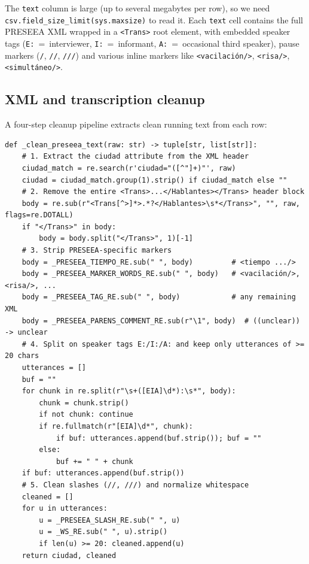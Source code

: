 \documentclass[11pt,a4paper]{article}
\begin{document}
The \texttt{text} column is large (up to several megabytes per row), so
we need \texttt{csv.field\_size\_limit(sys.maxsize)} to read it. Each
\texttt{text} cell contains the full PRESEEA XML wrapped in a
\texttt{<Trans>} root element, with embedded speaker tags
(\texttt{E:}\ =\ interviewer, \texttt{I:}\ =\ informant,
\texttt{A:}\ =\ occasional third speaker), pause markers
(\texttt{/}, \texttt{//}, \texttt{///}) and various inline markers like
\texttt{<vacilación/>}, \texttt{<risa/>}, \texttt{<simultáneo/>}.

\subsection{XML and transcription cleanup}

A four-step cleanup pipeline extracts clean running text from each row:

\begin{lstlisting}[style=pycode,caption={PRESEEA transcription cleaner.}]
def _clean_preseea_text(raw: str) -> tuple[str, list[str]]:
    # 1. Extract the ciudad attribute from the XML header
    ciudad_match = re.search(r'ciudad="([^"]+)"', raw)
    ciudad = ciudad_match.group(1).strip() if ciudad_match else ""
    # 2. Remove the entire <Trans>...</Hablantes></Trans> header block
    body = re.sub(r"<Trans[^>]*>.*?</Hablantes>\s*</Trans>", "", raw, flags=re.DOTALL)
    if "</Trans>" in body:
        body = body.split("</Trans>", 1)[-1]
    # 3. Strip PRESEEA-specific markers
    body = _PRESEEA_TIEMPO_RE.sub(" ", body)         # <tiempo .../>
    body = _PRESEEA_MARKER_WORDS_RE.sub(" ", body)   # <vacilación/>, <risa/>, ...
    body = _PRESEEA_TAG_RE.sub(" ", body)            # any remaining XML
    body = _PRESEEA_PARENS_COMMENT_RE.sub(r"\1", body)  # ((unclear)) -> unclear
    # 4. Split on speaker tags E:/I:/A: and keep only utterances of >= 20 chars
    utterances = []
    buf = ""
    for chunk in re.split(r"\s+([EIA]\d*):\s*", body):
        chunk = chunk.strip()
        if not chunk: continue
        if re.fullmatch(r"[EIA]\d*", chunk):
            if buf: utterances.append(buf.strip()); buf = ""
        else:
            buf += " " + chunk
    if buf: utterances.append(buf.strip())
    # 5. Clean slashes (//, ///) and normalize whitespace
    cleaned = []
    for u in utterances:
        u = _PRESEEA_SLASH_RE.sub(" ", u)
        u = _WS_RE.sub(" ", u).strip()
        if len(u) >= 20: cleaned.append(u)
    return ciudad, cleaned
\end{lstlisting}
\end{document}
